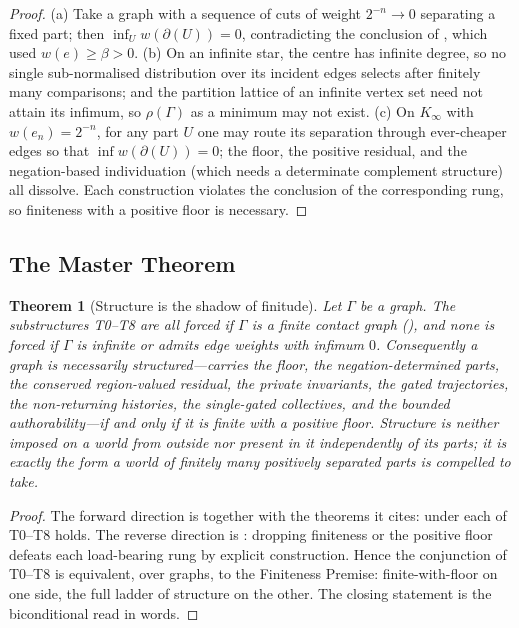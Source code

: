 \documentclass[11pt,a4paper]{article}
\theoremstyle{thmstyle}
\newtheorem{theorem}{Theorem}[section]
\theoremstyle{definition}
\theoremstyle{remark}
\newcommand{\Gph}{\Gamma}                 %
\newcommand{\wt}{w}                       %
\newcommand{\floorc}{\beta}               %
\newcommand{\cut}{\partial}               %
\newcommand{\Res}{\rho}                   %
\begin{document}
\begin{proof}
(a) Take a graph with a sequence of cuts of weight $2^{-n}\to0$ separating a
fixed part; then $\inf_U\wt(\cut(U))=0$, contradicting the conclusion of
, which used $\wt(e)\ge\floorc>0$. (b) On an infinite star, the
centre has infinite degree, so no single sub-normalised distribution over its
incident edges selects after finitely many comparisons; and the partition lattice
of an infinite vertex set need not attain its infimum, so $\Res(\Gph)$ as a
minimum may not exist. (c) On $K_\infty$ with $\wt(e_n)=2^{-n}$, for any part $U$
one may route its separation through ever-cheaper edges so that
$\inf\wt(\cut(U))=0$; the floor, the positive residual, and the negation-based
individuation (which needs a determinate complement structure) all dissolve.
Each construction violates the conclusion of the corresponding rung, so finiteness
with a positive floor is necessary.
\end{proof}

\subsection{The Master Theorem}

\begin{theorem}[Structure is the shadow of finitude]
\label{thm:master}
Let $\Gph$ be a graph. The substructures T0--T8 are all forced if $\Gph$ is a
finite contact graph \textup{(}\textup{)}, and none is forced if
$\Gph$ is infinite or admits edge weights with infimum $0$. Consequently a graph
is necessarily structured---carries the floor, the negation-determined parts, the
conserved region-valued residual, the private invariants, the gated trajectories,
the non-returning histories, the single-gated collectives, and the bounded
authorability---\emph{if and only if} it is finite with a positive floor. Structure
is neither imposed on a world from outside nor present in it independently of its
parts; it is exactly the form a world of finitely many positively separated parts
is compelled to take.
\end{theorem}

\begin{proof}
The forward direction is  together with the theorems it
cites: under  each of T0--T8 holds. The reverse direction is
: dropping finiteness or the positive floor defeats each
load-bearing rung by explicit construction. Hence the conjunction of T0--T8 is
equivalent, over graphs, to the Finiteness Premise: finite-with-floor on one
side, the full ladder of structure on the other. The closing statement is the
biconditional read in words.
\end{proof}
\end{document}
